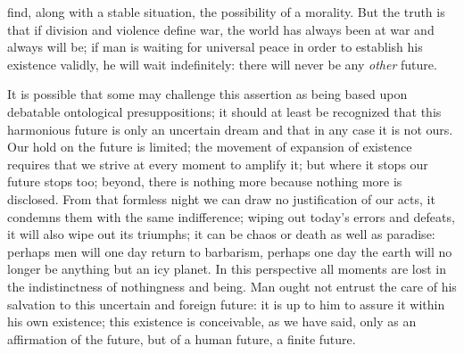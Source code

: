 \documentclass[11pt]{article}
\begin{document}
{{find, along with a stable situation, the possibility of a morality. But the truth is that if division and violence define war, the world has always been at war and always will be; if man is waiting for universal peace in order to establish his existence validly, he will wait indefinitely: there will never be any \textit{other} future.

It is possible that some may challenge this assertion as being based upon debatable ontological presuppositions; it should at least be recognized that this harmonious future is only an uncertain dream and that in any case it is not ours. Our hold on the future is limited; the movement of expansion of existence requires that we strive at every moment to amplify it; but where it stops our future stops too; beyond, there is nothing more because nothing more is disclosed. From that formless night we can draw no justification of our acts, it condemns them with the same indifference; wiping out today’s errors and defeats, it will also wipe out its triumphs; it can be chaos or death as well as paradise: perhaps men will one day return to barbarism, perhaps one day the earth will no longer be anything but an icy planet. In this perspective all moments are lost in the indistinctness of nothingness and being. Man ought not entrust the care of his salvation to this uncertain and foreign future: it is up to him to assure it within his own existence; this existence is conceivable, as we have said, only as an affirmation of the future, but of a human future, a finite future.

}}
\end{document}
